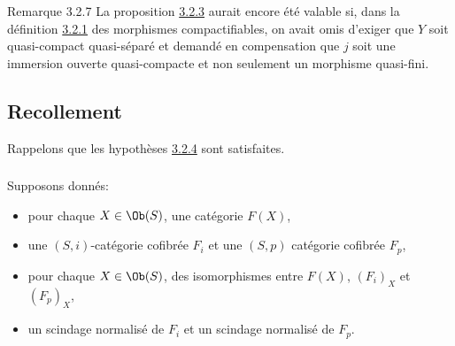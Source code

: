 \documentclass[10pt]{../fichiers-configuration-latex/smfart}
\begin{document}
\begin{enonce*}{Remarque 3.2.7}
La proposition \hyperref[XVII.prop3.2.3]{3.2.3} aurait encore été valable si, dans la définition
\hyperref[XVII.def3.2.1]{3.2.1} des morphismes compactifiables, on avait omis d'exiger que $Y$
soit quasi-compact quasi-séparé et demandé en compensation que $j$
soit une immersion ouverte quasi-compacte et non seulement un
morphisme quasi-fini.
\end{enonce*}

\subsection{Recollement}

Rappelons que les hypothèses \hyperref[XVII.subsubsec3.2.4]{3.2.4} sont satisfaites.

\subsubsection{}
Supposons donnés:
\begin{itemize}
\item[$\alpha$)] pour chaque $X\in \Ob (S)$, une catégorie $F(X)$,

\item[$\beta$)] une $(S,i)$-catégorie cofibrée $F_i$ et une $(S,p)$
catégorie cofibrée $F_{p}$,

\item[$\gamma$)] pour chaque $X\in \Ob(S)$, des isomorphismes entre
$F(X)$, $(F_{i})_X$ et $(F_{p})_X$,

\item[$\delta$)] un scindage normalisé de $F_{i}$ et un scindage
normalisé de $F_{p}$.
\end{itemize}
\end{document}
